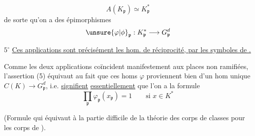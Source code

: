 \[
A(K_{\mathfrak p})\simeq K_{\mathfrak p}^*
\]
de sorte qu'on a des épimorphismes
\[
{\unsure{\varphi|\phi}}_{\mathfrak p}:K_{\mathfrak p}^*\longrightarrow G_{\mathfrak p}^{d}
\]

\textcircled{$5^\circ$} \uline{Ces applications sont précisément les hom. de réciprocité,  par les symboles de   .}

Comme les deux applications coïncident manifestement aux places non ramifiées, l'assertion (5) équivaut au fait que ces homs $\varphi$  proviennent bien d'un hom unique $C(K)\longrightarrow G_{\mathfrak p}^{d}$, i.e.  \uline{signifient} \uline{essentiellement} que l'on a la formule
\[
\boxed{\prod_{\mathfrak p}\varphi_{\mathfrak p}(x_{\mathfrak p})=1\qquad\text{si }x\in K^*}
\]

(Formule qui  équivaut à la partie difficile de la théorie  des corps de classes pour les corps de ).
